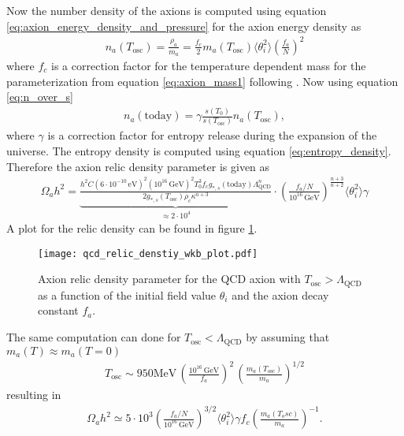 \documentclass[a4paper, 12pt]{article}
\begin{document}
Now the number density of the axions is computed using equation \ref{eq:axion_energy_density_and_pressure} for the axion energy density as
\begin{align*}
    n_a(T_\mathrm{osc}) = \frac{\rho_a}{m_a} = \frac{f_c}{2} m_a(T_\mathrm{osc}) \langle \theta_i^2 \rangle \left( \frac{f_a}{N} \right)^2
\end{align*}
where $f_c$ is a correction factor for the temperature dependent mass for the parameterization from equation \ref{eq:axion_mass1} following \cite[Sec. 2.1]{Fox:2004kb}.
Now using equation \ref{eq:n_over_s}
\begin{align*}
    n_a(\mathrm{today}) = \gamma \frac{s(T_0)}{s(T_\mathrm{osc})} n_a(T_\mathrm{osc}),
\end{align*}
where $\gamma$ is a correction factor for entropy release during the expansion of the universe.
The entropy density is computed using equation \ref{eq:entropy_density}.
Therefore the axion relic density parameter is given as
\begin{align}
    \label{eq:relic_density_high_temp}
    \Omega_a h^2 = \underbrace{
    \frac{h^2 C (6 \cdot 10^{-10} \, \mathrm{eV})^2 (10^{16} \, \mathrm{GeV})^2 T_0^3 f_c g_{*, s}(\mathrm{today}) \Lambda_\mathrm{QCD}^n}{2 g_{*, s}(T_\mathrm{osc}) \rho_c \kappa^{n + 3}}
    }_{\approx 2 \cdot 10^4} \cdot \left( \frac{f_a / N}{10^{16} \, \mathrm{GeV}}\right) ^ {\frac{n + 3}{n + 2}} \langle \theta_i^2 \rangle \gamma
\end{align}
A plot for the relic density can be found in figure \ref{fig:qcd_wkb_plot}.
\begin{figure}
    \centering
    \texttt{[image: qcd\_relic\_denstiy\_wkb\_plot.pdf]}
    \caption{Axion relic density parameter for the QCD axion with $T_\mathrm{osc} > \Lambda_\mathrm{QCD}$
    as a function of the initial field value $\theta_i$ and the axion decay constant $f_a$.}
    \label{fig:qcd_wkb_plot}
\end{figure}
The same computation can done for $T_\mathrm{osc} < \Lambda_\mathrm{QCD}$ by assuming that $m_a(T) \approx m_a(T = 0)$ \cite[Sec. 2.1]{Fox:2004kb}
\begin{align*}
    T_\mathrm{osc} \sim 950 \mathrm{MeV} \, \left(\frac{10^{16} \, \mathrm{GeV}}{f_a} \right)^2 \, \left(\frac{m_a(T_\mathrm{osc})}{m_a} \right)^{1/2}
\end{align*}
resulting in
\begin{align}
    \label{eq:axion_mass2}
    \Omega_a h^2 \simeq 5 \cdot 10^3 \left( \frac{f_a / N}{10^{16} \, \mathrm{GeV}} \right)^{3/2} \langle \theta_i^2 \rangle \gamma f_c \left( \frac{m_a(T_osc)}{m_a} \right)^{-1}.
\end{align}
\end{document}
